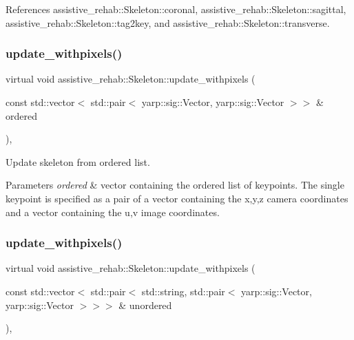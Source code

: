 References assistive\+\_\+rehab\+::\+Skeleton\+::coronal, assistive\+\_\+rehab\+::\+Skeleton\+::sagittal, assistive\+\_\+rehab\+::\+Skeleton\+::tag2key, and assistive\+\_\+rehab\+::\+Skeleton\+::transverse.

\mbox{\label{classassistive__rehab_1_1Skeleton_a20d9eb5aecd6dccfa7e049bb932a6cef}} 
\subsubsection{\texorpdfstring{update\_withpixels()}{update\_withpixels()}\hspace{0.1cm}{\footnotesize\ttfamily [1/2]}}
{\footnotesize\ttfamily virtual void assistive\+\_\+rehab\+::\+Skeleton\+::update\+\_\+withpixels (\begin{DoxyParamCaption}\item[{const std\+::vector$<$ std\+::pair$<$ yarp\+::sig\+::\+Vector, yarp\+::sig\+::\+Vector $>$$>$ \&}]{ordered }\end{DoxyParamCaption})\hspace{0.3cm}{\ttfamily [virtual]}, {\ttfamily [inherited]}}



Update skeleton from ordered list. 


\begin{DoxyParams}{Parameters}
{\em ordered} & vector containing the ordered list of keypoints. The single keypoint is specified as a pair of a vector containing the x,y,z camera coordinates and a vector containing the u,v image coordinates. \\
\hline
\end{DoxyParams}
\mbox{\label{classassistive__rehab_1_1Skeleton_a36e9dfd4910120025e40ccc3d03c0e01}} 
\subsubsection{\texorpdfstring{update\_withpixels()}{update\_withpixels()}\hspace{0.1cm}{\footnotesize\ttfamily [2/2]}}
{\footnotesize\ttfamily virtual void assistive\+\_\+rehab\+::\+Skeleton\+::update\+\_\+withpixels (\begin{DoxyParamCaption}\item[{const std\+::vector$<$ std\+::pair$<$ std\+::string, std\+::pair$<$ yarp\+::sig\+::\+Vector, yarp\+::sig\+::\+Vector $>$$>$$>$ \&}]{unordered }\end{DoxyParamCaption})\hspace{0.3cm}{\ttfamily [virtual]}, {\ttfamily [inherited]}}




